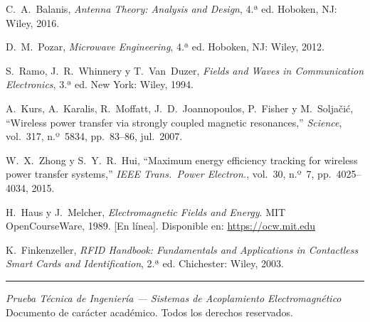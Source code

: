\documentclass[11pt,a4paper]{article}
\begin{document}
\begin{enumerate}[label={[\arabic*]}]
  \item C.~A.~Balanis, \textit{Antenna Theory: Analysis and Design}, 4.ª ed.
        Hoboken, NJ: Wiley, 2016.
  \item D.~M.~Pozar, \textit{Microwave Engineering}, 4.ª ed.
        Hoboken, NJ: Wiley, 2012.
  \item S.~Ramo, J.~R.~Whinnery y T.~Van~Duzer, \textit{Fields and Waves in
        Communication Electronics}, 3.ª ed. New York: Wiley, 1994.
  \item A.~Kurs, A.~Karalis, R.~Moffatt, J.~D.~Joannopoulos, P.~Fisher y
        M.~Solja\v{c}i\'c, ``Wireless power transfer via strongly coupled magnetic
        resonances,'' \textit{Science}, vol.~317, n.º~5834, pp.~83--86, jul.~2007.
  \item W.~X.~Zhong y S.~Y.~R.~Hui, ``Maximum energy efficiency tracking for
        wireless power transfer systems,'' \textit{IEEE Trans.\ Power Electron.},
        vol.~30, n.º~7, pp.~4025--4034, 2015.
  \item H.~Haus y J.~Melcher, \textit{Electromagnetic Fields and Energy}.
        MIT OpenCourseWare, 1989. [En línea]. Disponible en:
        \url{https://ocw.mit.edu}
  \item K.~Finkenzeller, \textit{RFID Handbook: Fundamentals and Applications
        in Contactless Smart Cards and Identification}, 2.ª ed.
        Chichester: Wiley, 2003.
\end{enumerate}

\vfill
\noindent\color{grisbordes}\rule{\linewidth}{0.4pt}
\begin{center}
  \small\color{gray}
  \textit{Prueba Técnica de Ingeniería --- Sistemas de Acoplamiento Electromagnético}\\
  Documento de carácter académico. Todos los derechos reservados.
\end{center}
\end{document}
